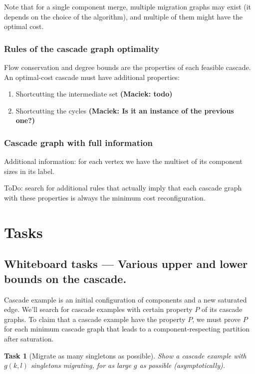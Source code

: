 \documentclass[a4paper,USenglish]{lipics-v2019}
\newtheorem{task}{Task}
\newcommand\maciek[1]{\color{brown}\textbf{(Maciek: #1)}\color{black}}
\begin{document}
Note that for a single component merge, multiple migration graphs may exist (it
depends on the choice of the algorithm), and multiple of them might have the optimal cost.

\subsubsection{Rules of the cascade graph optimality}

Flow conservation and degree bounds are the properties of each feasible cascade.
An optimal-cost cascade must have additional properties:
\begin{enumerate}
    \item Shortcutting the intermediate set \maciek{todo}
    \item Shortcutting the cycles \maciek{Is it an instance of the previous one?}
\end{enumerate}

\subsubsection{Cascade graph with full information}

Additional information: for each vertex we have the multiset of its component sizes in its label.

ToDo: search for additional rules that actually imply that each cascade graph with these properties is always the minimum cost reconfiguration.

\section{Tasks}

\subsection{Whiteboard tasks --- Various upper and lower bounds on the cascade.}


Cascade example is an initial configuration of components and a new saturated edge.
We'll search for cascade examples with certain property $P$ of its cascade graphs.
To claim that a cascade example have the property $P$, we must prove $P$ for each minimum cascade graph that leads to a component-respecting partition after saturation.

\begin{task}[Migrate as many singletons as possible]
Show a cascade example with $g(k,l)$ singletons migrating, for as large $g$ as possible (asymptotically).
\end{task}
\end{document}
